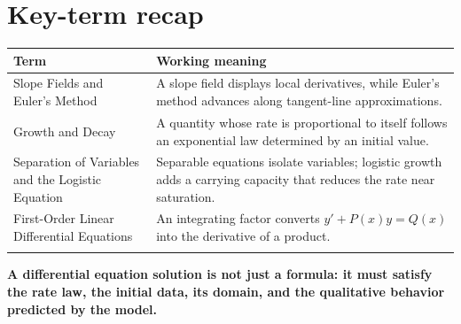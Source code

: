 \documentclass[11pt]{article}
\begin{document}
\section{Key-term recap}
\small
\begin{longtable}{@{}>{\RaggedRight\arraybackslash}p{}>{\RaggedRight\arraybackslash}p{}@{}}
\toprule
\textbf{Term} & \textbf{Working meaning}\\
\midrule\endhead
Slope Fields and Euler's Method & A slope field displays local derivatives, while Euler's method advances along tangent-line approximations. \\\addlinespace[2pt]
Growth and Decay & A quantity whose rate is proportional to itself follows an exponential law determined by an initial value. \\\addlinespace[2pt]
Separation of Variables and the Logistic Equation & Separable equations isolate variables; logistic growth adds a carrying capacity that reduces the rate near saturation. \\\addlinespace[2pt]
First-Order Linear Differential Equations & An integrating factor converts $y'+P(x)y=Q(x)$ into the derivative of a product. \\\addlinespace[2pt]
\bottomrule
\end{longtable}
\normalsize

\enlargethispage{4\baselineskip}
\begin{tcolorbox}[title=One-sentence takeaway,fonttitle=\bfseries,colback=Ink,colframe=Ink,coltext=white,coltitle=white,arc=2mm,boxrule=0pt]
\centering\bfseries A differential equation solution is not just a formula: it must satisfy the rate law, the initial data, its domain, and the qualitative behavior predicted by the model.
\end{tcolorbox}
\end{document}
